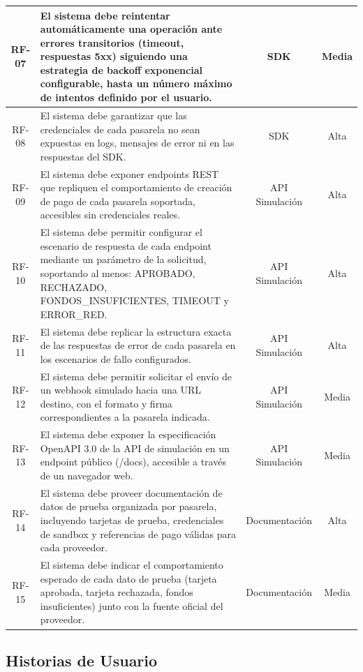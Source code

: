 \documentclass[10pt]{article}
\begin{document}
\begin{center}
\begin{longtable}{|c|p{8.5cm}|c|c|}
  \hline
  RF-07 & El sistema debe reintentar automáticamente una operación ante errores transitorios (timeout, respuestas 5xx) siguiendo una estrategia de backoff exponencial configurable, hasta un número máximo de intentos definido por el usuario. & SDK & Media \\
  \hline
  RF-08 & El sistema debe garantizar que las credenciales de cada pasarela no sean expuestas en logs, mensajes de error ni en las respuestas del SDK. & SDK & Alta \\
  \hline
  RF-09 & El sistema debe exponer endpoints REST que repliquen el comportamiento de creación de pago de cada pasarela soportada, accesibles sin credenciales reales. & API Simulación & Alta \\
  \hline
  RF-10 & El sistema debe permitir configurar el escenario de respuesta de cada endpoint mediante un parámetro de la solicitud, soportando al menos: APROBADO, RECHAZADO, FONDOS\_INSUFICIENTES, TIMEOUT y ERROR\_RED. & API Simulación & Alta \\
  \hline
  RF-11 & El sistema debe replicar la estructura exacta de las respuestas de error de cada pasarela en los escenarios de fallo configurados. & API Simulación & Alta \\
  \hline
  RF-12 & El sistema debe permitir solicitar el envío de un webhook simulado hacia una URL destino, con el formato y firma correspondientes a la pasarela indicada. & API Simulación & Media \\
  \hline
  RF-13 & El sistema debe exponer la especificación OpenAPI 3.0 de la API de simulación en un endpoint público (/docs), accesible a través de un navegador web. & API Simulación & Media \\
  \hline
  RF-14 & El sistema debe proveer documentación de datos de prueba organizada por pasarela, incluyendo tarjetas de prueba, credenciales de sandbox y referencias de pago válidas para cada proveedor. & Documentación & Alta \\
  \hline
  RF-15 & El sistema debe indicar el comportamiento esperado de cada dato de prueba (tarjeta aprobada, tarjeta rechazada, fondos insuficientes) junto con la fuente oficial del proveedor. & Documentación & Media \\
  \hline
\end{longtable}
\end{center}

\subsection{Historias de Usuario}
\end{document}
